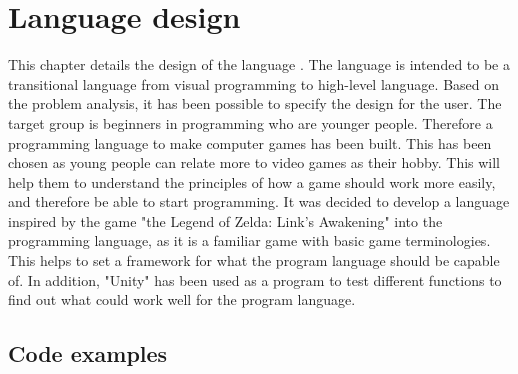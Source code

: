 \chapter{Language design}
This chapter details the design of the language .
The language is intended to be a transitional language from visual programming to high-level language. Based on the problem analysis, it has been possible to specify the design for the user.
The target group is beginners in programming who are younger people. Therefore a programming language to make computer games has been built. This has been chosen as young people can relate more to video games as their hobby. 
This will help them to understand the principles of how a game should work more easily, and therefore be able to start programming. 
It was decided to develop a language inspired by the game "the Legend of Zelda: Link’s Awakening" into the programming language, as it is a familiar game with basic game terminologies.
This helps to set a framework for what the program language should be capable of.
In addition, "Unity" has been used as a program to test different functions to find out what could work well for the program language.



\section{Code examples}

